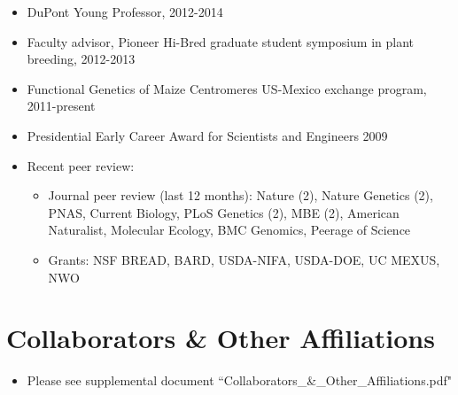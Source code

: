 \documentclass[11pt]{article}
\newcommand{\ignore}[1]{}
\begin{document}
\begin{itemize} \setlength{\itemsep}{0pt} \setlength{\parskip}{2pt} \setlength{\parsep}{0pt}

\item DuPont Young Professor, 2012-2014

\item Faculty advisor, Pioneer Hi-Bred graduate student symposium in plant breeding, 2012-2013


\item Functional Genetics of Maize Centromeres US-Mexico exchange program, 2011-present

\item Presidential Early Career Award for Scientists and Engineers 2009

\item Recent peer review: 
\begin{itemize} 
\item Journal peer review (last 12 months): \ignore{8/13,10/13} Nature (2), \ignore {1/14, 3/14} Nature Genetics (2), \ignore{6/13,7/13,8/13} PNAS, \ignore{8/13} Current Biology, \ignore{3/13,4/14,4/14} PLoS Genetics (2), \ignore{7/14,7/14} MBE (2), \ignore {3/14} American Naturalist, \ignore{1/14} Molecular Ecology, \ignore{1/14} BMC Genomics, \ignore{9/13} Peerage of Science
\item Grants: NSF BREAD, BARD, USDA-NIFA, USDA-DOE, UC MEXUS, NWO
\end{itemize}
\end{itemize}


\section{Collaborators \& Other Affiliations}

\begin{itemize} \setlength{\itemsep}{0pt} \setlength{\parskip}{2pt} \setlength{\parsep}{0pt}
\item Please see supplemental document ``Collaborators\_\&\_Other\_Affiliations.pdf"
\end{itemize}

\end{document}
